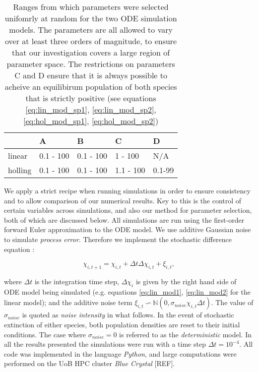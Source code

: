 \begin{center}
\begin{table}
\centering
    \begin{tabular}{| l | l | l | l | l |}

    \hline
     & A & B & C & D\\ \hline
    linear & 0.1 - 100 & 0.1 - 100 & 1 - 100 & N/A \\ \hline
    holling & 0.1 - 100 & 0.1 - 100 & 1.1 - 100 & 0.1-99 \\
    \hline
    \end{tabular}
\caption{Ranges from which parameters were selected unifomrly at random for the two ODE simulation models. The parameters are all allowed to vary over at least three orders of magnitude, to ensure that our investigation covers a large region of parameter space. The restrictions on parameters C and D ensure that it is always possible to acheive an equilibirum population of both species that is strictly positive (see equations \ref{eq:lin_mod_sp1}, \ref{eq:lin_mod_sp2}, \ref{eq:hol_mod_sp1}, \ref{eq:hol_mod_sp2})}
\label{table:p_range}    
\end{table}
\end{center}


We apply a strict recipe when running simulations in order to ensure consistency and to allow comparison of our numerical results. Key to this is the control of certain variables across simulations, and also our method for parameter selection, both of which are discussed below. All simulations are run using the first-order forward Euler approximation to the ODE model. We use additive Gaussian noise to simulate \emph{process error}. Therefore we implement the stochastic difference equation :

\begin{equation}
\label{eq:stochastic_diff}
\chi_{i, t+1} = \chi_{i, t} + \Delta t\Delta\chi_{i,t} + \xi_{i,t},
\end{equation}

where $\Delta t$ is the integration time step, $\Delta\chi_{i}$ is given by the right hand side of ODE model being simulated (e.g. equations \ref{eq:lin_mod1}, \ref{eq:lin_mod2} for the linear model); and the additive noise term $\xi_{i,t} \backsim \mathbb{N}(0, \sigma_{noise}\chi_{i,t}\Delta t)$. The value of $\sigma_{noise}$ is quoted as \emph{noise intensity} in what follows. In the event of stochastic extinction of either species, both population densities are reset to their initial conditions. The case where $\sigma_{noise} = 0$ is referred to as the \emph{deterministic} model. In all the results presented the simulations were run with a time step $\Delta t = 10^{-4}$. All code was implemented in the language \emph{Python}, and large computations were performed on the UoB HPC cluster \emph{Blue Crystal} [REF].

